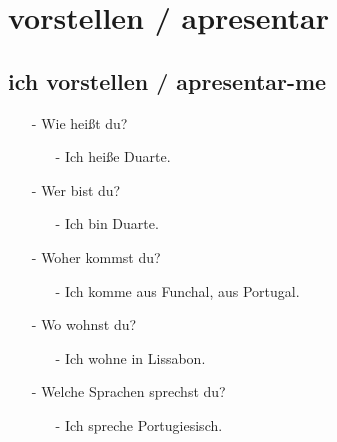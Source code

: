     \section{vorstellen / apresentar}\label{section:deutsch:vorstellen}

        \subsection{ich vorstellen / apresentar-me}\label{subsection:deutsch:ich_vorstellen}
            
            \begin{itemize}[before=\renewcommand{\baselinestretch}{1},topsep=0pt,itemsep=4pt,parsep=0pt]
                \item[-] Wie heißt du? 
                    \begin{itemize}
                        \item[-] Ich heiße Duarte. 
                    \end{itemize}
                \item[-] Wer bist du? 
                    \begin{itemize}
                        \item[-] Ich bin Duarte. 
                    \end{itemize}
                \item[-] Woher kommst du? 
                    \begin{itemize}
                        \item[-] Ich komme aus Funchal, aus Portugal. 
                    \end{itemize}
                \item[-] Wo wohnst du? 
                    \begin{itemize}
                        \item[-] Ich wohne in Lissabon. 
                    \end{itemize}
                \item[-] Welche Sprachen sprechst du? 
                    \begin{itemize}
                        \item[-] Ich spreche Portugiesisch. 
                    \end{itemize}
            \end{itemize}

